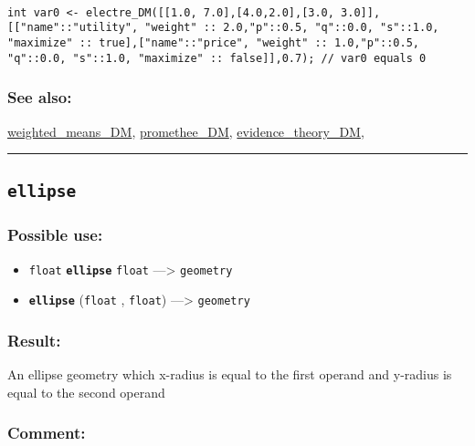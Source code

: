 \documentclass[]{book}
\providecommand{\tightlist}{%
  \setlength{\itemsep}{0pt}\setlength{\parskip}{0pt}}
\theoremstyle{definition}
\theoremstyle{definition}
\theoremstyle{definition}
\theoremstyle{remark}
\begin{document}
\begin{verbatim}
 
int var0 <- electre_DM([[1.0, 7.0],[4.0,2.0],[3.0, 3.0]], [["name"::"utility", "weight" :: 2.0,"p"::0.5, "q"::0.0, "s"::1.0, "maximize" :: true],["name"::"price", "weight" :: 1.0,"p"::0.5, "q"::0.0, "s"::1.0, "maximize" :: false]],0.7); // var0 equals 0
\end{verbatim}

\subsubsection{See also:}\label{see-also-86}

\href{OperatorsSZ\#weighted_means_dm}{weighted\_means\_DM},
\href{OperatorsNR\#promethee_dm}{promethee\_DM},
\href{OperatorsDH\#evidence_theory_dm}{evidence\_theory\_DM},

\begin{center}\rule{0.5\linewidth}{\linethickness}\end{center}

\subsection{\texorpdfstring{\texttt{ellipse}}{ellipse}}\label{ellipse}

\subsubsection{Possible use:}\label{possible-use-150}

\begin{itemize}
\tightlist
\item
  \texttt{float} \textbf{\texttt{ellipse}} \texttt{float}
  ---\textgreater{} \texttt{geometry}
\item
  \textbf{\texttt{ellipse}} (\texttt{float} , \texttt{float})
  ---\textgreater{} \texttt{geometry}
\end{itemize}

\subsubsection{Result:}\label{result-144}

An ellipse geometry which x-radius is equal to the first operand and
y-radius is equal to the second operand

\subsubsection{Comment:}\label{comment-31}
\end{document}

